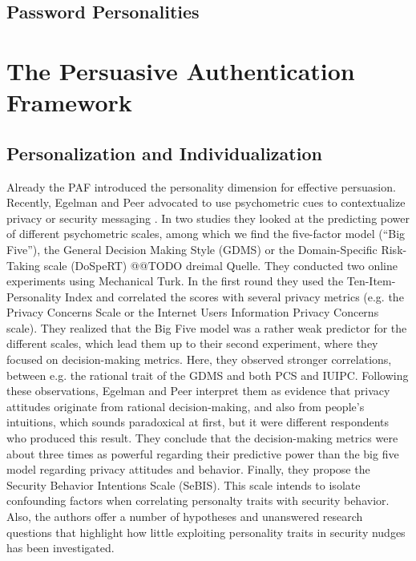 	\subsection{Password Personalities}

\section{The Persuasive Authentication Framework}


\subsection{Personalization and Individualization}
Already the PAF introduced the personality dimension for effective persuasion. Recently, Egelman and Peer advocated to use psychometric cues to contextualize privacy or security messaging \cite{Egelman2015AverageUser}. In two studies they looked at the predicting power of different psychometric scales, among which we find the five-factor model (``Big Five''), the General Decision Making Style (GDMS) or the Domain-Specific Risk-Taking scale (DoSpeRT) @@TODO dreimal Quelle. They conducted two online experiments using Mechanical Turk. In the first round they used the Ten-Item-Personality Index and correlated the scores with several privacy metrics (e.g. the Privacy Concerns Scale or the Internet Users Information Privacy Concerns scale). They realized that the Big Five model was a rather weak predictor for the different scales, which lead them up to their second experiment, where they focused on decision-making metrics. Here, they observed stronger correlations, between e.g. the rational trait of the GDMS and both PCS and IUIPC. Following these observations, Egelman and Peer interpret them as evidence that privacy attitudes originate from rational decision-making, and also from people's intuitions, which sounds paradoxical at first, but it were different respondents who produced this result. They conclude that the decision-making metrics were about three times as powerful regarding their predictive power than the big five model regarding privacy attitudes and behavior. Finally, they propose the Security Behavior Intentions Scale (SeBIS). This scale intends to isolate confounding factors when correlating personalty traits with security behavior. Also, the authors offer a number of hypotheses and unanswered research questions that highlight how little exploiting personality traits in security nudges has been investigated. 


